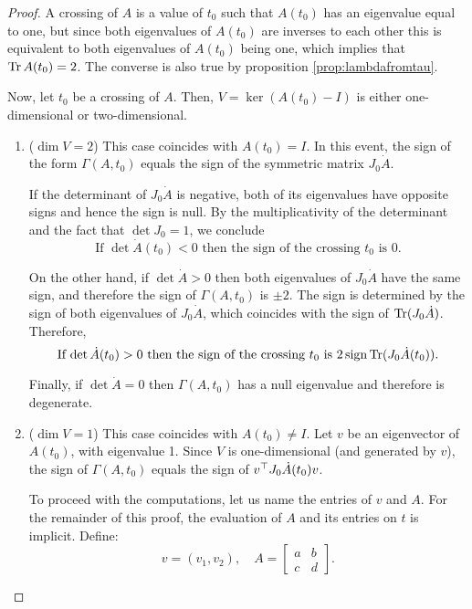 \begin{proof}
A crossing of $A$ is a value of $t_0$ such that $A(t_0)$ has an eigenvalue equal to one, but since both eigenvalues of $A(t_0)$ are inverses to each other this is equivalent to both eigenvalues of $A(t_0)$ being one, which implies that $\operatorname{Tr} A(t_0) = 2$. The converse is also true by proposition \ref{prop:lambdafromtau}.

Now, let $t_0$ be a crossing of $A$. Then, $V = \ker(A(t_0) - I)$ is either one-dimensional or two-dimensional.

\begin{enumerate}[label={Case \arabic*.}]
\item ($\dim V = 2$) This case coincides with $A(t_0) = I$. In this event, the sign of the form $\Gamma(A,t_0)$ equals the sign of the symmetric matrix $J_0 \dot A$.

If the determinant of $J_0 \dot A$ is negative, both of its eigenvalues have opposite signs and hence the sign is null. By the multiplicativity of the determinant and the fact that $\det J_0 = 1$, we conclude
\begin{equation}
\text{If $\det \dot A(t_0) < 0$ then the sign of the crossing $t_0$ is 0.}
\end{equation}

On the other hand, if $\det \dot A > 0$ then both eigenvalues of $J_0 \dot A$ have the same sign, and therefore the sign of $\Gamma(A,t_0)$ is $\pm 2$. The sign is determined by the sign of both eigenvalues of $J_0 \dot A$, which coincides with the sign of $\operatorname{Tr}(J_0 \dot A)$. Therefore,
\begin{equation}
\text{If $\det \dot A(t_0) > 0$ then the sign of the crossing $t_0$ is $2 \operatorname{sign} \operatorname{Tr}(J_0 \dot A(t_0))$.}
\end{equation}

Finally, if $\det \dot A = 0$ then $\Gamma(A,t_0)$ has a null eigenvalue and therefore is degenerate.

\item ($\dim V = 1$) This case coincides with $A(t_0) \neq I$. Let $v$ be an eigenvector of $A(t_0)$, with eigenvalue 1. Since $V$ is one-dimensional (and generated by $v$), the sign of $\Gamma(A,t_0)$ equals the sign of $v^\top J_0 \dot A(t_0) v$.

To proceed with the computations, let us name the entries of $v$ and $A$. For the remainder of this proof, the evaluation of $A$ and its entries on $t$ is implicit. Define:
\begin{equation}
v = (v_1, v_2), \quad
A = \begin{bmatrix} a & b \\ c & d \end{bmatrix}.
\end{equation}


\end{enumerate}
\end{proof}
